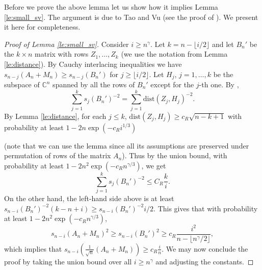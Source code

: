 \documentclass[12pt,reqno]{amsart}
\begin{document}
Before we prove the above lemma let us show how it implies Lemma
\ref{le:small_sv}. The argument is due to Tao and Vu (see the proof of
\cite[Lemma 6.7]{TV}). We present it here for completeness.

\begin{proof}[Proof of Lemma \ref{le:small_sv}] Consider $i \ge n^\gamma$. Let
  $k = n - \lfloor i/2\rfloor$ and let $B_n'$ be the $k\times n$ matrix with
  rows $Z_1,\ldots,Z_k$ (we use the notation from Lemma \ref{le:distance}). By
  Cauchy interlacing inequalities we have $s_{n-j}(A_n+M_n) \ge s_{n-j}(B_n')$
  for $j\ge \lfloor i/2\rfloor$. Let $H_j$, $j = 1,\ldots,k$ be the subspace
  of ${\mathbb{C}}^n$ spanned by all the rows of $B_n'$ except for the $j$-th one. By
  \cite[Lemma A4]{TV},
  \[
  \sum_{j=1}^k s_j(B_n')^{-2} = \sum_{j=1}^k {\mathrm{dist}}(Z_j,H_j)^{-2}.
  \]
  By Lemma \ref{le:distance}, for each $j\le k$, ${\mathrm{dist}}(Z_j,H_j) \ge
  c_R\sqrt{n-k+1}$ with probability at least $1 - 2n\exp(-c_R i^{1/3})$
  
  (note that we can use the lemma since all its assumptions are preserved
  under permutation of rows of the matrix $A_n$). Thus by the union bound,
  with probability at least $1 - 2n^2\exp(-c_R n^{\gamma/3})$, we get
  \[
  \sum_{j=1}^k s_j(B_n')^{-2} \le C_R \frac{k}{i}.
  \]
  On the other hand, the left-hand side above is at least $s_{n-i}(B_n')^{-2}
  (k - n + i) \ge s_{n-i}(B_n')^{-2} i/2$. This gives that with probability at
  least $1 - 2n^2\exp(-c_R n^{\gamma/3})$,
  \[
  s_{n-i}(A_n+M_n)^2 \ge s_{n-i}(B_n')^2   \ge c_R \frac{ i^2 }{n - \lfloor n^{\gamma}/2\rfloor},
  \]
  which implies that $s_{n-i}(\frac{1}{\sqrt{n}}(A_n+M_n)) \ge
  c_R\frac{i}{n}$. We may now conclude the proof by taking the union bound
  over all $i \ge n^\gamma$ and adjusting the constants.
\end{proof}
\end{document}
